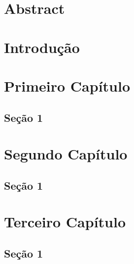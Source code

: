 \documentclass[12pt, a4paper]{report}
\begin{document}
\newpage
\chapter*{Abstract}
\thispagestyle{empty}


\newpage
\tableofcontents
\thispagestyle{empty}


\chapter*{Introdução}
\pagestyle{myheadings}
\setcounter{page}{1}



\chapter{Primeiro Capítulo}


\section{Seção 1}



\chapter{Segundo Capítulo}


\section{Seção 1}


\chapter{Terceiro Capítulo}


\section{Seção 1}




\nocite{Lucas1, Lucas2, Bonola}


\newpage
\renewcommand{\refname}{Referências Bibliográficas}

\end{document}
